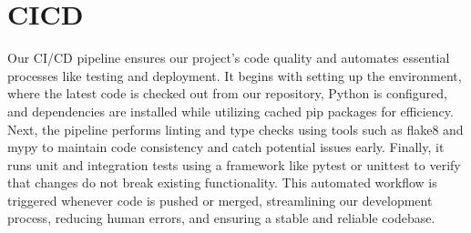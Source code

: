 \documentclass{article}
\begin{document}
\section{CICD}

Our CI/CD pipeline ensures our project's code quality and automates essential processes like testing and deployment. It begins with setting up the environment, where the latest code is checked out from our repository, Python is configured, and dependencies are installed while utilizing cached pip packages for efficiency. Next, the pipeline performs linting and type checks using tools such as flake8 and mypy to maintain code consistency and catch potential issues early. Finally, it runs unit and integration tests using a framework like pytest or unittest to verify that changes do not break existing functionality. This automated workflow is triggered whenever code is pushed or merged, streamlining our development process, reducing human errors, and ensuring a stable and reliable codebase.
\end{document}

